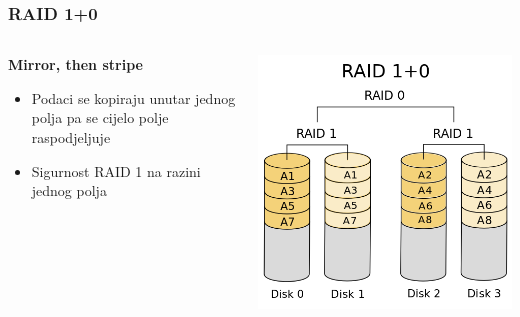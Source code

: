 \documentclass[t]{beamer}
\begin{document}
\begin{frame}
	\frametitle{RAID 1+0}
	
	\begin{columns}[T]
	\begin{column}{0.55\textwidth}
		\textbf{Mirror, then stripe}
		\begin{itemize}
			\item Podaci se kopiraju unutar jednog polja pa se cijelo polje raspodjeljuje
		\end{itemize}
		\begin{itemize}
			\item Sigurnost RAID 1 na razini jednog polja
		\end{itemize}
	\end{column}
	\begin{column}{0.45\textwidth}
		\includegraphics[width=\textwidth]{500px-RAID_10.png}
	\end{column}
	\end{columns}
\end{frame}
\end{document}
